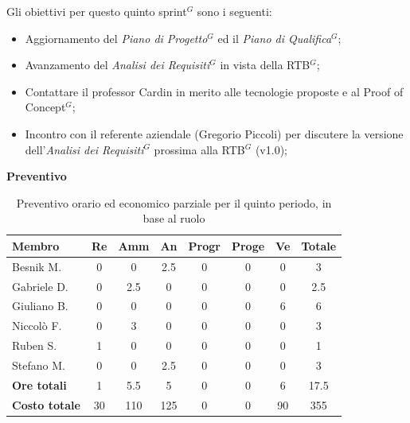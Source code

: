 \documentclass[a4paper,10pt]{article}
\begin{document}
Gli obiettivi per questo quinto sprint$^G$ sono i seguenti:
\begin{itemize}
  \item Aggiornamento del \textit{Piano di Progetto$^G$} ed il \textit{Piano di Qualifica$^G$};
  \item Avanzamento del \textit{Analisi dei Requisiti$^G$} in vista della RTB$^G$;
  \item Contattare il professor Cardin in merito alle tecnologie proposte e al Proof of Concept$^G$;
  \item Incontro con il referente aziendale (Gregorio Piccoli) per discutere la versione dell'\textit{Analisi dei Requisiti$^G$} prossima alla RTB$^G$ (v1.0);
\end{itemize}

\textbf{Preventivo} \\
\begin{table}[H]
\centering
\begin{tabular}{|l|c|c|c|c|c|c|c|}
\hline
\textbf{Membro} & \textbf{Re} & \textbf{Amm} & \textbf{An} & \textbf{Progr} & \textbf{Proge} & \textbf{Ve} & \textbf{Totale} \\
\hline
Besnik M.   & 0   & 0   & 2.5 & 0 & 0 & 0 & 3   \\
Gabriele D. & 0   & 2.5   & 0   & 0 & 0 & 0 & 2.5 \\
Giuliano B. & 0 & 0 & 0 & 0 & 0 & 6   & 6 \\
Niccolò F.  & 0   & 3   & 0  & 0 & 0 & 0   & 3   \\
Ruben S.    & 1   & 0 & 0   & 0 & 0 & 0   & 1  \\
Stefano M.  & 0   & 0   & 2.5  & 0 & 0 & 0   & 3   \\
\hline
\textbf{Ore totali} & 1 & 5.5 & 5 & 0 & 0 & 6 & 17.5 \\
\hline
\textbf{Costo totale} & 30 & 110 & 125 & 0 & 0 & 90 & 355 \\
\hline
\end{tabular}
\caption{Preventivo orario ed economico parziale per il quinto periodo, in base al ruolo}
\end{table}
\end{document}
